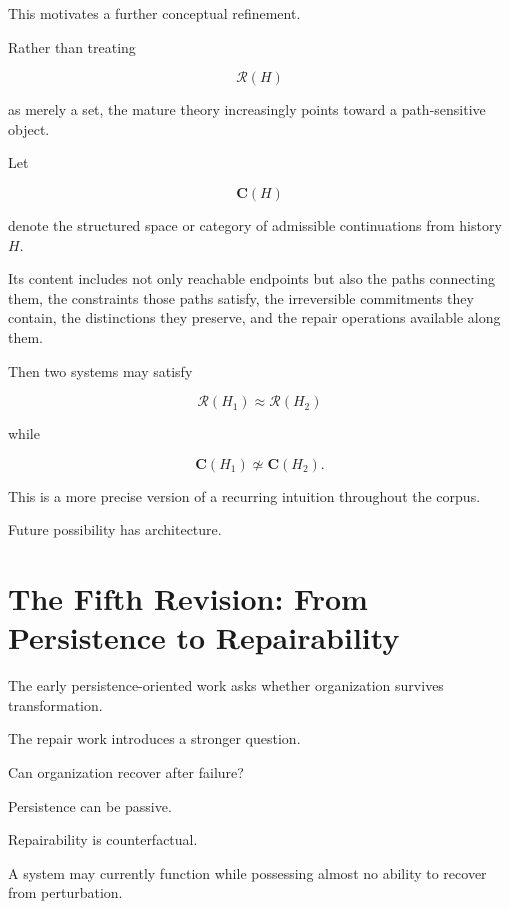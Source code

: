 \documentclass[11pt]{article}
\theoremstyle{remark}
\newcommand{\Reach}{\mathcal{R}}
\begin{document}
This motivates a further conceptual refinement.

Rather than treating

\begin{equation}
\Reach(H)
\end{equation}

as merely a set, the mature theory increasingly points toward a path-sensitive object.

Let

\begin{equation}
\mathbf{C}(H)
\end{equation}

denote the structured space or category of admissible continuations from history $H$.

Its content includes not only reachable endpoints but also the paths connecting them, the constraints those paths satisfy, the irreversible commitments they contain, the distinctions they preserve, and the repair operations available along them.

Then two systems may satisfy

\begin{equation}
\Reach(H_1)
\approx
\Reach(H_2)
\end{equation}

while

\begin{equation}
\mathbf{C}(H_1)
\not\simeq
\mathbf{C}(H_2).
\end{equation}

This is a more precise version of a recurring intuition throughout the corpus.

Future possibility has architecture.

\section{The Fifth Revision: From Persistence to Repairability}

The early persistence-oriented work asks whether organization survives transformation.

The repair work introduces a stronger question.

Can organization recover after failure?

Persistence can be passive.

Repairability is counterfactual.

A system may currently function while possessing almost no ability to recover from perturbation.
\end{document}
